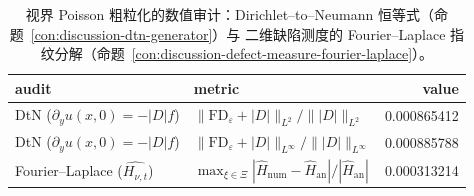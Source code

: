 \begin{table}[H]
\centering
\small
\begin{tabular}{l l r}
\toprule
audit & metric & value\\
\midrule
DtN ($\partial_y u(x,0)=-|D|f$) & $\|\mathrm{FD}_\varepsilon+|D|\|_{L^2}/\||D|\|_{L^2}$ & 0.000865412\\
DtN ($\partial_y u(x,0)=-|D|f$) & $\|\mathrm{FD}_\varepsilon+|D|\|_{L^\infty}/\||D|\|_{L^\infty}$ & 0.000885788\\
Fourier--Laplace ($\widehat{H_{\nu,t}}$) & $\max_{\xi\in\Xi}|\widehat{H}_{\mathrm{num}}-\widehat{H}_{\mathrm{an}}|/|\widehat{H}_{\mathrm{an}}|$ & 0.000313214\\
\bottomrule
\end{tabular}
\caption{视界 Poisson 粗粒化的数值审计：Dirichlet--to--Neumann 恒等式（命题~\ref{con:discussion-dtn-generator}）与 二维缺陷测度的 Fourier--Laplace 指纹分解（命题~\ref{con:discussion-defect-measure-fourier-laplace}）。}
\label{tab:xi-horizon-dtn-fourier-laplace-audit}
\end{table}
